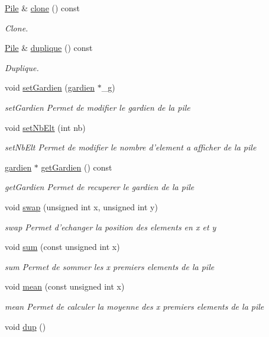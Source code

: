 \begin{DoxyCompactItemize}
\hyperlink{class_pile}{Pile} \& \hyperlink{class_pile_a13e1620ba0de2d1cd4b1f66f5356a8b4}{clone} () const 
\begin{DoxyCompactList}\small\item\em Clone. \end{DoxyCompactList}\item 
\hyperlink{class_pile}{Pile} \& \hyperlink{class_pile_aee5282e29d14470c8805b62830207306}{duplique} () const 
\begin{DoxyCompactList}\small\item\em Duplique. \end{DoxyCompactList}\item 
void \hyperlink{class_pile_aace6210d258170c7420d6a4bda5ec967}{set\-Gardien} (\hyperlink{classgardien}{gardien} $\ast$\-\_\-g)
\begin{DoxyCompactList}\small\item\em set\-Gardien Permet de modifier le gardien de la pile \end{DoxyCompactList}\item 
void \hyperlink{class_pile_a09fd751d9d6d0d3c861f97405756db56}{set\-Nb\-Elt} (int nb)
\begin{DoxyCompactList}\small\item\em set\-Nb\-Elt Permet de modifier le nombre d'element a afficher de la pile \end{DoxyCompactList}\item 
\hyperlink{classgardien}{gardien} $\ast$ \hyperlink{class_pile_af610383f7aa4076d56646753de61bdc6}{get\-Gardien} () const 
\begin{DoxyCompactList}\small\item\em get\-Gardien Permet de recuperer le gardien de la pile \end{DoxyCompactList}\item 
void \hyperlink{class_pile_ab6c3f9840427e2be87e0d76c8697fff5}{swap} (unsigned int x, unsigned int y)
\begin{DoxyCompactList}\small\item\em swap Permet d'echanger la position des elements en x et y \end{DoxyCompactList}\item 
void \hyperlink{class_pile_ab2671569b6870d06fb94179e998e2e2e}{sum} (const unsigned int x)
\begin{DoxyCompactList}\small\item\em sum Permet de sommer les x premiers elements de la pile \end{DoxyCompactList}\item 
void \hyperlink{class_pile_a3993e0e33e78011663b15b9eb723d456}{mean} (const unsigned int x)
\begin{DoxyCompactList}\small\item\em mean Permet de calculer la moyenne des x premiers elements de la pile \end{DoxyCompactList}\item 
\hypertarget{class_pile_a081f7843d01cae1f0f7be7d92e46d5d2}{void \hyperlink{class_pile_a081f7843d01cae1f0f7be7d92e46d5d2}{dup} ()}\label{class_pile_a081f7843d01cae1f0f7be7d92e46d5d2}


\end{DoxyCompactItemize}
